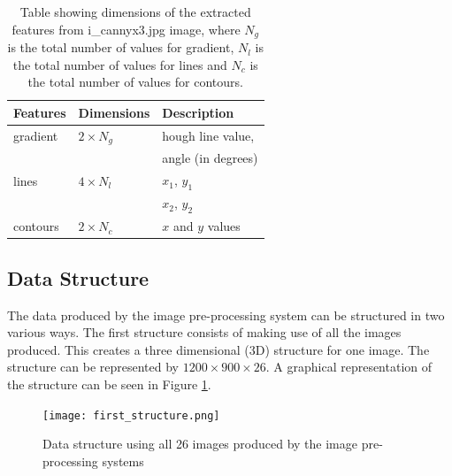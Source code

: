 \documentclass[11pt,twocolumn]{witseiepaper}
\begin{document}
	\begin{table}[!h]
		\centering
		\caption{Table showing dimensions of the extracted features from i\_cannyx3.jpg image, where $N_g$ is the total number of values for gradient, $N_l$ is the total number of values for lines and $N_c$ is the total number of values for contours.}
		\label{feature_selection}
		\begin{tabular}{|l|p{2cm}|l|}
			\hline
			Features & Dimensions & Description \\
			\hline \hline
			gradient & $2 \times N_g $ & hough line value, \\
			& & angle (in degrees)\\
			\hline
			lines    & $4 \times N_l $ & $x_{1}$, $y_{1}$ \\
			& & $x_{2}$, $y_{2}$ \\
			\hline
			contours & $2 \times N_c $  & $x$ and $y$ values \\
			\hline
		\end{tabular}
	\end{table}
	
	\subsection{Data Structure}
	The data produced by the image pre-processing system can be structured in two various ways. The first structure consists of making use of all the images produced. This creates a three dimensional (3D) structure for one image. The structure can be represented by $1200 \times 900 \times 26$. A graphical representation of the structure can be seen in Figure \ref{fig: first_structure}.
	\begin{figure}[!h]
		\centering
		\texttt{[image: first\_structure.png]}
		\caption{Data structure using all 26 images produced by the image pre-processing systems}
		\label{fig: first_structure}
	\end{figure}
	
\end{document}
